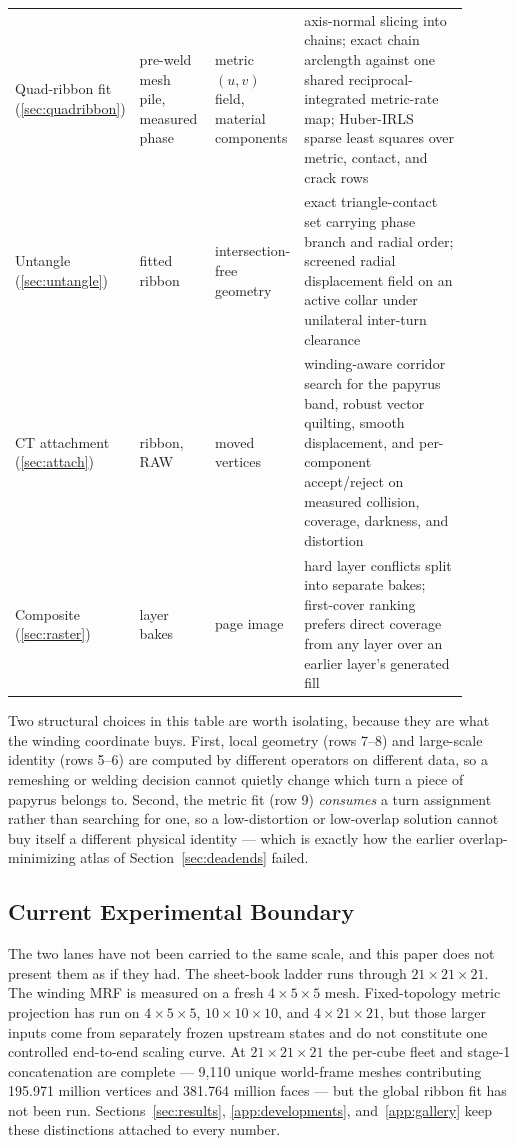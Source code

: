 \begin{table}[t]
\begin{tabular}{@{}p{0.13\linewidth}p{0.17\linewidth}p{0.17\linewidth}p{0.43\linewidth}@{}}
    \addlinespace[2pt]
    Quad-ribbon fit (\ref{sec:quadribbon}) &
      pre-weld mesh pile, measured phase &
      metric $(u,v)$ field, material components &
      axis-normal slicing into chains; exact chain arclength against one shared reciprocal-integrated metric-rate map; Huber-IRLS sparse least squares over metric, contact, and crack rows \\
    \addlinespace[2pt]
    Untangle (\ref{sec:untangle}) &
      fitted ribbon &
      intersection-free geometry &
      exact triangle-contact set carrying phase branch and radial order; screened radial displacement field on an active collar under unilateral inter-turn clearance \\
    \addlinespace[2pt]
    CT attachment (\ref{sec:attach}) &
      ribbon, RAW &
      moved vertices &
      winding-aware corridor search for the papyrus band, robust vector quilting, smooth displacement, and per-component accept/reject on measured collision, coverage, darkness, and distortion \\
    \addlinespace[2pt]
    Composite (\ref{sec:raster}) &
      layer bakes &
      page image &
      hard layer conflicts split into separate bakes; first-cover ranking prefers direct coverage from any layer over an earlier layer's generated fill \\
    \bottomrule
  \end{tabular}
\end{table}

Two structural choices in this table are worth isolating, because they are what the winding coordinate buys. First, local geometry (rows 7--8) and large-scale identity (rows 5--6) are computed by different operators on different data, so a remeshing or welding decision cannot quietly change which turn a piece of papyrus belongs to. Second, the metric fit (row 9) \emph{consumes} a turn assignment rather than searching for one, so a low-distortion or low-overlap solution cannot buy itself a different physical identity --- which is exactly how the earlier overlap-minimizing atlas of Section~\ref{sec:deadends} failed.

\subsection{Current Experimental Boundary}
\label{sec:boundary}

The two lanes have not been carried to the same scale, and this paper does not present them as if they had. The sheet-book ladder runs through $21\times21\times21$. The winding MRF is measured on a fresh $4\times5\times5$ mesh. Fixed-topology metric projection has run on $4\times5\times5$, $10\times10\times10$, and $4\times21\times21$, but those larger inputs come from separately frozen upstream states and do not constitute one controlled end-to-end scaling curve. At $21\times21\times21$ the per-cube fleet and stage-1 concatenation are complete --- 9,110 unique world-frame meshes contributing 195.971 million vertices and 381.764 million faces --- but the global ribbon fit has not been run. Sections~\ref{sec:results}, \ref{app:developments}, and~\ref{app:gallery} keep these distinctions attached to every number.
